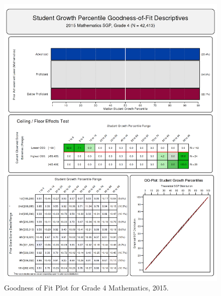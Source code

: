 \documentclass[12pt]{article}
\begin{document}
\begin{figure}[htbp]
\centering
\includegraphics{../img/Goodness_of_Fit/MATHEMATICS.2015/2015_MATH_4;2014_MATH_3.png}
\caption{Goodness of Fit Plot for Grade 4 Mathematics, 2015.}
\end{figure}
\end{document}
